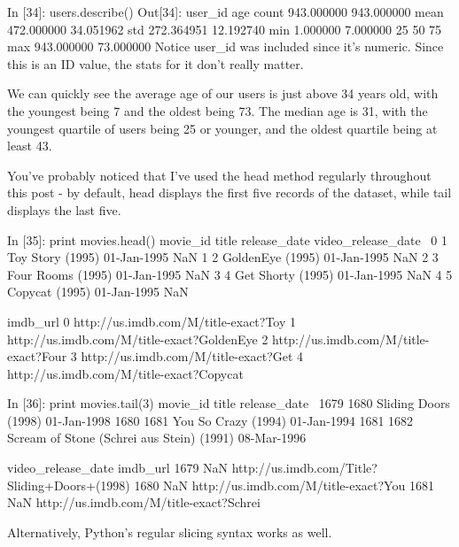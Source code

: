 In [34]:
users.describe()
Out[34]:
user_id	age
count	 943.000000	 943.000000
mean	 472.000000	 34.051962
std	 272.364951	 12.192740
min	 1.000000	 7.000000
25%
50%
75%
max	 943.000000	 73.000000
Notice user_id was included since it's numeric. Since this is an ID value, the stats for it don't really matter.

We can quickly see the average age of our users is just above 34 years old, with the youngest being 7 and the oldest being 73. The median age is 31, with the youngest quartile of users being 25 or younger, and the oldest quartile being at least 43.

You've probably noticed that I've used the head method regularly throughout this post - by default, head displays the first five records of the dataset, while tail displays the last five.

In [35]:
print movies.head()
   movie_id              title release_date  video_release_date  \
0         1   Toy Story (1995)  01-Jan-1995                 NaN   
1         2   GoldenEye (1995)  01-Jan-1995                 NaN   
2         3  Four Rooms (1995)  01-Jan-1995                 NaN   
3         4  Get Shorty (1995)  01-Jan-1995                 NaN   
4         5     Copycat (1995)  01-Jan-1995                 NaN   

                                            imdb_url  
0  http://us.imdb.com/M/title-exact?Toy%
1  http://us.imdb.com/M/title-exact?GoldenEye%
2  http://us.imdb.com/M/title-exact?Four%
3  http://us.imdb.com/M/title-exact?Get%
4  http://us.imdb.com/M/title-exact?Copycat%

In [36]:
print movies.tail(3)
      movie_id                                      title release_date  \
1679      1680                       Sliding Doors (1998)  01-Jan-1998   
1680      1681                        You So Crazy (1994)  01-Jan-1994   
1681      1682  Scream of Stone (Schrei aus Stein) (1991)  08-Mar-1996   

      video_release_date                                           imdb_url  
1679                 NaN      http://us.imdb.com/Title?Sliding+Doors+(1998)  
1680                 NaN  http://us.imdb.com/M/title-exact?You%
1681                 NaN  http://us.imdb.com/M/title-exact?Schrei%

Alternatively, Python's regular slicing syntax works as well.

